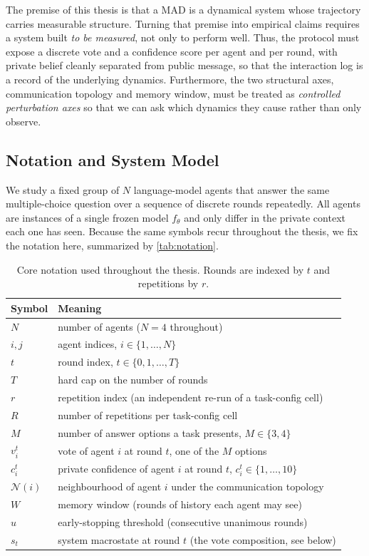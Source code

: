 The premise of this thesis is that a \ac{MAD} is a dynamical system
whose trajectory carries measurable structure. Turning that premise into empirical
claims requires a system built \emph{to be measured}, not only to perform well. Thus, the protocol must expose a
discrete vote and a confidence score per agent and per round, with private belief
cleanly separated from public message, so that the interaction log is a
record of the underlying dynamics. Furthermore, the two structural axes, communication topology and 
memory window, must be treated as \emph{controlled perturbation axes}
so that we can ask which dynamics they cause rather than only observe.

\subsection{Notation and System Model}
\label{sec:setup:notation}

We study a fixed group of $N$ language-model agents that answer the
same multiple-choice question over a sequence of discrete rounds repeatedly. All agents are
instances of a single frozen model $f_\theta$ and only differ in the private
context each one has seen. Because the same symbols recur throughout the
thesis, we fix the notation here, summarized by \autoref{tab:notation}.

\begin{table}[H]
\centering
\small
\begin{tabular}{ll}
\toprule
Symbol & Meaning \\
\midrule
$N$ & number of agents ($N = 4$ throughout) \\
$i, j$ & agent indices, $i \in \{1, \ldots, N\}$ \\
$t$ & round index, $t \in \{0, 1, \ldots, T\}$ \\
$T$ & hard cap on the number of rounds \\
$r$ & repetition index (an independent re-run of a task-config cell) \\
$R$ & number of repetitions per task-config cell \\
$M$ & number of answer options a task presents, $M \in \{3, 4\}$ \\
$v_i^{t}$ & vote of agent $i$ at round $t$, one of the $M$ options \\
$c_i^{t}$ & private confidence of agent $i$ at round $t$, $c_i^t \in \{1,\ldots,10\}$ \\
$\mathcal{N}(i)$ & neighbourhood of agent $i$ under the communication topology \\
$W$ & memory window (rounds of history each agent may see) \\
$u$ & early-stopping threshold (consecutive unanimous rounds) \\
$s_t$ & system macrostate at round $t$ (the vote composition, see below) \\
\bottomrule
\end{tabular}
\caption[Notation used throughout the thesis]{Core notation used throughout the thesis. Rounds are indexed by $t$ and
repetitions by $r$.}
\label{tab:notation}
\end{table}

